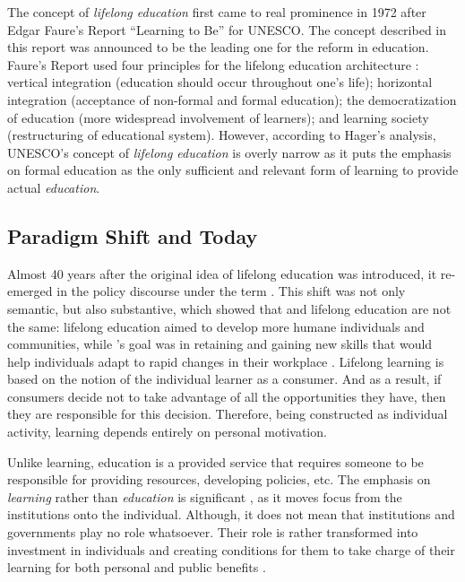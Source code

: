 The concept of \textit{lifelong education} first came to real prominence in 1972
after Edgar Faure's Report ``Learning to Be'' for UNESCO. The concept described
in this report was announced to be the leading one for the reform in education.
Faure's Report used four principles for the lifelong education architecture
\citep{Faure1972}: vertical integration (education should occur throughout one's
life); horizontal integration (acceptance of non-formal and formal education);
the democratization of education (more widespread involvement of learners); and
learning society (restructuring of educational system). However, according to
Hager's \citeyearpar{Hager2011} analysis, UNESCO's concept of \textit{lifelong
education} is overly narrow as it puts the emphasis on formal education as the
only sufficient and relevant form of learning to provide actual
\textit{education}.

\subsection{Paradigm Shift and \LLLc Today}

Almost 40 years after the original idea of lifelong education was introduced, 
it re-emerged in the policy discourse under the term \LLLs \citep{Boshier2000}.
This shift was not only semantic, but also substantive, which showed that \LLLs
and lifelong education are not the same: lifelong education aimed to develop
more humane individuals and communities, while \LLLsn's goal was in retaining
and gaining new skills that would help individuals adapt to rapid changes in
their workplace \citep{Medel-Anonuevo2001}. Lifelong learning is based on the
notion of the individual learner as a consumer. And as a result, if consumers
decide not to take advantage of all the opportunities they have, then they are
responsible for this decision. Therefore, being constructed as individual
activity, learning depends entirely on personal motivation.

Unlike learning, education is a provided service \citep{Boshier2000} that
requires someone to be responsible for providing resources, developing policies,
etc. The emphasis on \textit{learning} rather than \textit{education} is
significant \citep{Tuijnman2002}, as it moves focus from the institutions onto
the individual. Although, it does not mean that institutions and governments
play no role whatsoever. Their role is rather transformed into investment in
individuals and creating conditions for them to take charge of their learning
for both personal and public benefits \citep{Chen2009}.

